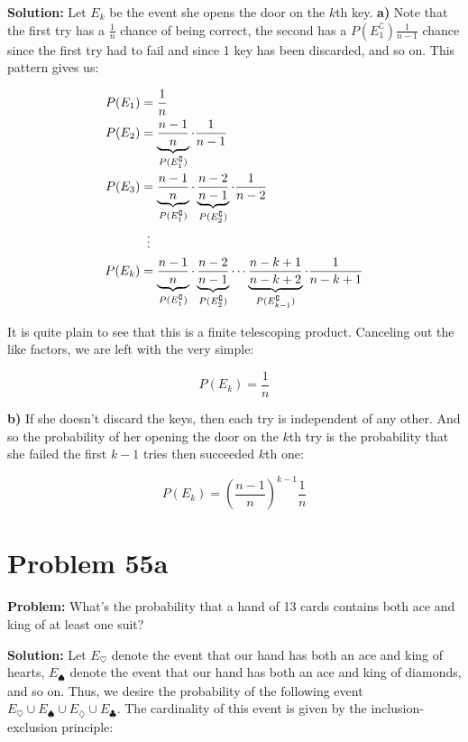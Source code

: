 \documentclass{article}
\begin{document}
\noindent\textbf{Solution:} Let $E_k$ be the event she opens the door on the $k$th key. \textbf{a)} Note that the first try has a $\frac{1}{n}$ chance of being correct, the second has a $P(E_1^\complement)\frac{1}{n-1}$ chance since the first try had to fail and since 1 key has been discarded, and so on. This pattern gives us:

\begin{align*}
    P(E_1)&=\frac{1}{n}\\
    P(E_2)&=\underbrace{\frac{n-1}{n}}_{P(E_1^\complement)}\cdot\frac{1}{n-1}\\
    P(E_3)&=\underbrace{\frac{n-1}{n}}_{P(E_1^\complement)}\cdot\underbrace{\frac{n-2}{n-1}}_{P(E_2^\complement)}\cdot\frac{1}{n-2}\\
    &\setbox0\hbox{=}\mathrel{\makebox[\wd0]{\hfil\vdots\hfil}}\\
    P(E_k)&=\underbrace{\frac{n-1}{n}}_{P(E_1^\complement)}\cdot\underbrace{\frac{n-2}{n-1}}_{P(E_2^\complement)}\cdots\underbrace{\frac{n-k+1}{n-k+2}}_{P(E_{k-1}^\complement)}\cdot\frac{1}{n-k+1}
\end{align*}

It is quite plain to see that this is a finite telescoping product. Canceling out the like factors, we are left with the very simple:

\begin{equation*}
    P(E_k)=\frac{1}{n}
\end{equation*}

\textbf{b)} If she doesn't discard the keys, then each try is independent of any other. And so the probability of her opening the door on the $k$th try is the probability that she failed the first $k-1$ tries then succeeded $k$th one:

\begin{equation*}
    P(E_k)=\left(\frac{n-1}{n}\right)^{k-1}\frac{1}{n}
\end{equation*}

\section*{Problem 55a}
\noindent\textbf{Problem:} What's the probability that a hand of 13 cards contains both ace and king of at least one suit?
\bigskip

\noindent\textbf{Solution:} Let $E_\heartsuit$ denote the event that our hand has both an ace and king of hearts, $E_\spadesuit$ denote the event that our hand has both an ace and king of diamonds, and so on. Thus, we desire the probability of the following event $E_\heartsuit\cup E_\spadesuit\cup E_\diamondsuit\cup E_\clubsuit$. The cardinality of this event is given by the inclusion-exclusion principle:
\end{document}

